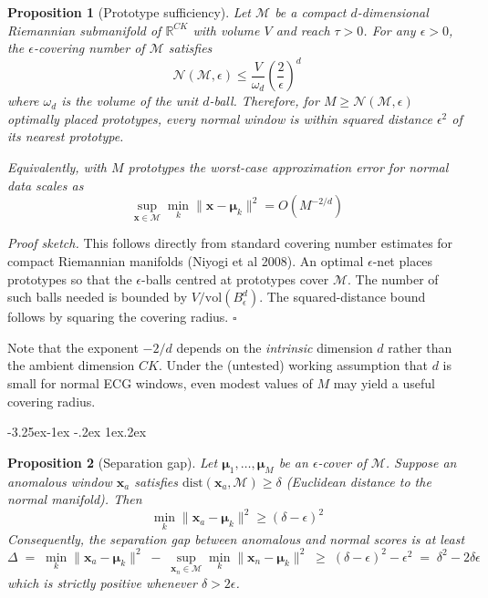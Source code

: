 \documentclass{iopjournal}
\makeatletter
\renewcommand\subsubsection{\@startsection{subsubsection}{3}{\z@}%
                                     {-3.25ex\@plus -1ex \@minus -.2ex}%
                                     {1ex\@plus .2ex}%
                                     {\reset@font\normalsize\itshape}}
\makeatother
\begin{document}
\textbf{Proposition 1} (Prototype sufficiency). \emph{Let $\mathcal{M}$ be a compact $d$-dimensional Riemannian submanifold of $\mathbb{R}^{CK}$ with volume $V$ and reach $\tau > 0$. For any $\epsilon > 0$, the $\epsilon$-covering number of $\mathcal{M}$ satisfies}
\begin{equation}
\mathcal{N}(\mathcal{M}, \epsilon) \leq \frac{V}{\omega_d} \left( \frac{2}{\epsilon} \right)^d
\end{equation}
\emph{where $\omega_d$ is the volume of the unit $d$-ball. Therefore, for $M \geq \mathcal{N}(\mathcal{M}, \epsilon)$ optimally placed prototypes, every normal window is within squared distance $\epsilon^2$ of its nearest prototype.}

\emph{Equivalently, with $M$ prototypes the worst-case approximation error for normal data scales as}
\begin{equation}
\sup_{\mathbf{x} \in \mathcal{M}} \min_{k} \|\mathbf{x} - \boldsymbol{\mu}_k\|^2 = O\!\left( M^{-2/d} \right)
\end{equation}

\emph{Proof sketch.} This follows directly from standard covering number estimates for compact Riemannian manifolds (Niyogi et al 2008). An optimal $\epsilon$-net places prototypes so that the $\epsilon$-balls centred at prototypes cover $\mathcal{M}$. The number of such balls needed is bounded by $V / \mathrm{vol}(B_\epsilon^d)$. The squared-distance bound follows by squaring the covering radius. $\square$

Note that the exponent $-2/d$ depends on the \emph{intrinsic} dimension $d$ rather than the ambient dimension $CK$. Under the (untested) working assumption that $d$ is small for normal ECG windows, even modest values of $M$ may yield a useful covering radius. 

\subsubsection{}

\textbf{Proposition 2} (Separation gap). \emph{Let $\boldsymbol{\mu}_1, \ldots, \boldsymbol{\mu}_M$ be an $\epsilon$-cover of $\mathcal{M}$. Suppose an anomalous window $\mathbf{x}_a$ satisfies $\mathrm{dist}(\mathbf{x}_a, \mathcal{M}) \geq \delta$ (Euclidean distance to the normal manifold). Then}
\begin{equation}
\min_{k} \|\mathbf{x}_a - \boldsymbol{\mu}_k\|^2 \geq (\delta - \epsilon)^2
\end{equation}
\emph{Consequently, the separation gap between anomalous and normal scores is at least}
\begin{equation}
\Delta \;=\; \min_k \|\mathbf{x}_a - \boldsymbol{\mu}_k\|^2 \;-\; \sup_{\mathbf{x}_n \in \mathcal{M}} \min_k \|\mathbf{x}_n - \boldsymbol{\mu}_k\|^2 \;\geq\; (\delta - \epsilon)^2 - \epsilon^2 \;=\; \delta^2 - 2\delta\epsilon
\end{equation}
\emph{which is strictly positive whenever $\delta > 2\epsilon$.}
\end{document}

